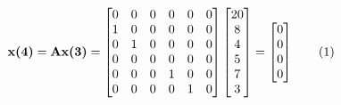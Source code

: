 \documentclass[12pt]{book}
\theoremstyle{plain}
\newcommand\addtag{\refstepcounter{equation}
\renewcommand{\labelenumii}{\theenumii}
\renewcommand{\theenumii}{\theenumi.\arabic{enumii}.}
\tag{\theequation}}
\begin{document}
\[
\textbf{x(4)}=\textbf{Ax(3)}=\A \xIII = \xIV \addtag
\]
%



% 
 
\end{document}
